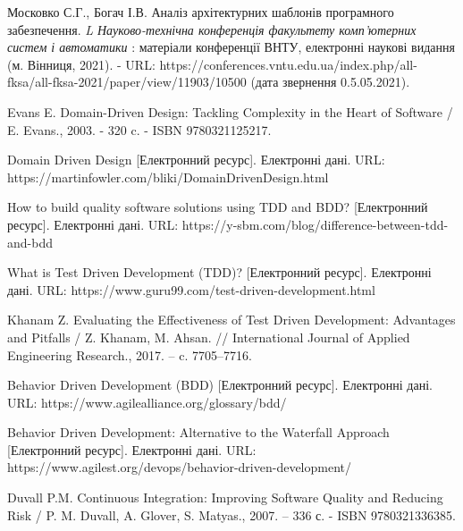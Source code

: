 \begingroup
\renewcommand{\section}[2]{\anonsection{Перелік посилань}}
\begin{thebibliography}{00}

      Московко С.Г., Богач І.В.
      Аналіз архітектурних шаблонів програмного забезпечення.
			\emph{L Науково-технічна конференція факультету комп'ютерних систем і автоматики} :
			матеріали конференції ВНТУ, електронні наукові видання (м. Вінниця, 2021).
      - URL: https://conferences.vntu.edu.ua/index.php/all-fksa/all-fksa-2021/paper/view/11903/10500
			(дата звернення 0.5.05.2021).

      Evans E.
      Domain-Driven Design: Tackling Complexity in the Heart of Software /
      E. Evans., 2003. - 320 c. - ISBN 9780321125217.

      Domain Driven Design
      [Електронний ресурс]. Електронні дані.
      URL: https://martinfowler.com/bliki/DomainDrivenDesign.html
	
			How to build quality software solutions using TDD and BDD?
      [Електронний ресурс]. Електронні дані.
			URL: https://y-sbm.com/blog/difference-between-tdd-and-bdd

			What is Test Driven Development (TDD)?
      [Електронний ресурс]. Електронні дані.
      URL: https://www.guru99.com/test-driven-development.html
	
			Khanam Z.
			Evaluating the Effectiveness of Test Driven Development: Advantages and Pitfalls /
			Z. Khanam, M. Ahsan. //
			International Journal of Applied Engineering Research., 2017. – c. 7705–7716.
	
			Behavior Driven Development (BDD)
      [Електронний ресурс]. Електронні дані.
			URL: https://www.agilealliance.org/glossary/bdd/

			Behavior Driven Development: Alternative to the Waterfall Approach
      [Електронний ресурс]. Електронні дані.
			URL: https://www.agilest.org/devops/behavior-driven-development/
	
			Duvall P.M. 
			Continuous Integration: Improving Software Quality and Reducing Risk /
			P. M. Duvall, A. Glover, S. Matyas., 2007. – 336 с. - ISBN 9780321336385.
	

\end{thebibliography}
